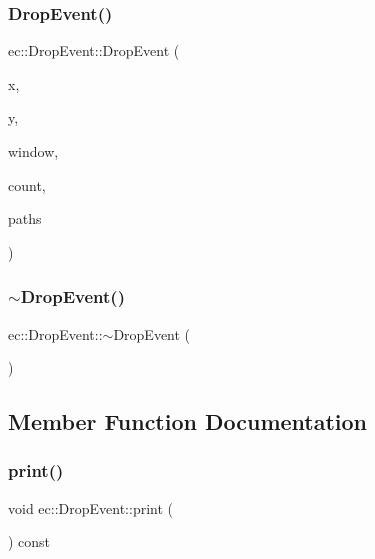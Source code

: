 \subsubsection{\texorpdfstring{Drop\+Event()}{DropEvent()}\hspace{0.1cm}{\footnotesize\ttfamily [2/2]}}
{\footnotesize\ttfamily ec\+::\+Drop\+Event\+::\+Drop\+Event (\begin{DoxyParamCaption}\item[{int}]{x,  }\item[{int}]{y,  }\item[{G\+L\+F\+Wwindow $\ast$}]{window,  }\item[{int}]{count,  }\item[{const char $\ast$$\ast$}]{paths }\end{DoxyParamCaption})\hspace{0.3cm}{\ttfamily [explicit]}}

\mbox{\label{structec_1_1_drop_event_ad68bca5b7ca0c65690fc85d682d057db}} 
\subsubsection{\texorpdfstring{$\sim$\+Drop\+Event()}{~DropEvent()}}
{\footnotesize\ttfamily ec\+::\+Drop\+Event\+::$\sim$\+Drop\+Event (\begin{DoxyParamCaption}{ }\end{DoxyParamCaption})\hspace{0.3cm}{\ttfamily [default]}}



\subsection{Member Function Documentation}
\mbox{\label{structec_1_1_drop_event_a6cda7eaf944e0b94f49a8523c7da2656}} 
\subsubsection{\texorpdfstring{print()}{print()}}
{\footnotesize\ttfamily void ec\+::\+Drop\+Event\+::print (\begin{DoxyParamCaption}{ }\end{DoxyParamCaption}) const}



